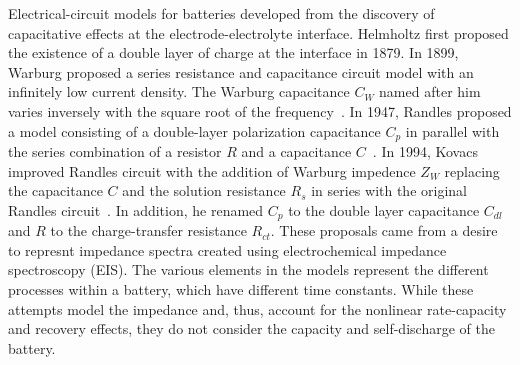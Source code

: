 \documentclass[../zhang_thesis.tex]{subfiles}
\begin{document}
Electrical-circuit models for batteries developed from the discovery of capacitative effects at the electrode-electrolyte interface. Helmholtz first proposed the existence of a double layer of charge at the interface in 1879. In 1899, Warburg proposed a series resistance and capacitance circuit model with an infinitely low current density. The Warburg capacitance $C_W$ named after him varies inversely with the square root of the frequency~\cite{geddes97}. In 1947, Randles proposed a model
consisting of a double-layer polarization capacitance $C_p$ in parallel with the series combination of a resistor $R$ and a capacitance $C$~\cite{randles47}. In 1994, Kovacs improved Randles circuit with the addition of Warburg impedence $Z_W$ replacing the capacitance $C$ and the solution resistance $R_s$ in series with the original Randles circuit~\cite{kovacs95}. In addition, he renamed $C_p$ to the double layer capacitance $C_{dl}$ and $R$ to the charge-transfer resistance
$R_{ct}$. These proposals came from a desire to represnt impedance spectra created using electrochemical impedance spectroscopy (EIS). The various elements in the models represent the different processes within a battery, which have different time constants. While these attempts model the impedance and, thus, account for the nonlinear rate-capacity and recovery effects, they do not consider the capacity and self-discharge of the battery.


\end{document}
